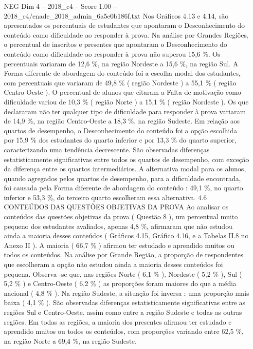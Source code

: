 \begin{textsample}{NEG Dim 4 – 2018\_c4 – Score 1.00 – 2018\_c4/enade\_2018\_admin\_6a5e0b186f.txt}
Nos Gráficos 4.13 e 4.14, são apresentados os percentuais de estudantes que apontaram o Desconhecimento do conteúdo como dificuldade ao responder à prova.
Na análise por Grandes Regiões, o percentual de inscritos e presentes que apontaram o Desconhecimento do conteúdo como dificuldade ao responder à prova não superou 15,6 \%.
Os percentuais variaram de 12,6 \%, na região Nordeste a 15,6 \%, na região Sul.
A Forma diferente de abordagem do conteúdo foi a escolha modal dos estudantes, com percentuais que variaram de 49,8 \% ( região Nordeste ) a 55,1 \% ( região Centro-Oeste ).
O percentual de alunos que citaram a Falta de motivação como dificuldade variou de 10,3 \% ( região Norte ) a 15,1 \% ( região Nordeste ).
Os que declararam não ter qualquer tipo de dificuldade para responder à prova variaram de 14,9 \%, na região Centro-Oeste a 18,3 \%, na região Sudeste.
Em relação aos quartos de desempenho, o Desconhecimento do conteúdo foi a opção escolhida por 15,9 \% dos estudantes do quarto inferior e por 13,3 \% do quarto superior, caracterizando uma tendência decrescente.
São observadas diferenças estatisticamente significativas entre todos os quartos de desempenho, com exceção da diferença entre os quartos intermediários.
A alternativa modal para os alunos, quando agregados pelos quartos de desempenho, para a dificuldade encontrada, foi causada pela Forma diferente de abordagem do conteúdo : 49,1 \%, no quarto inferior e 53,3 \%, do terceiro quarto escolheram essa alternativa. 4.6 CONTEÚDOS DAS QUESTÕES OBJETIVAS DA PROVA Ao analisar os conteúdos das questões objetivas da prova ( Questão 8 ), um percentual muito pequeno dos estudantes avaliados, apenas 4,8 \%, afirmaram que não estudou ainda a maioria desses conteúdos ( Gráficos 4.15, Gráfico 4.16, e a Tabelas II.8 no Anexo II ).
A maioria ( 66,7 \% ) afirmou ter estudado e aprendido muitos ou todos os conteúdos.
Na análise por Grande Região, a proporção de respondentes que escolheram a opção não estudou ainda a maioria desses conteúdos foi pequena.
Observa -se que, nas regiões Norte ( 6,1 \% ), Nordeste ( 5,2 \% ), Sul ( 5,2 \% ) e Centro-Oeste ( 6,2 \% ) as proporções foram maiores do que a média nacional ( 4,8 \% ).
Na região Sudeste, a situação foi inversa : uma proporção mais baixa ( 4,1 \% ).
São observadas diferenças estatisticamente significativas entre as regiões Sul e Centro-Oeste, assim como entre a região Sudeste e todas as outras regiões.
Em todas as regiões, a maioria dos presentes afirmou ter estudado e aprendido muitos ou todos os conteúdos, com proporções variando entre 62,5 \%, na região Norte a 69,4 \%, na região Sudeste.

\end{textsample}
